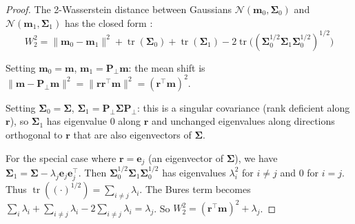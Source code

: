 \begin{proof}
The 2-Wasserstein distance between Gaussians $\mathcal{N}(\mathbf{m}_0, \boldsymbol{\Sigma}_0)$ and $\mathcal{N}(\mathbf{m}_1, \boldsymbol{\Sigma}_1)$ has the closed form \citep{dowson1982frechet,givens1984class}:
\begin{equation}
    W_2^2 = \|\mathbf{m}_0 - \mathbf{m}_1\|^2 + \operatorname{tr}(\boldsymbol{\Sigma}_0) + \operatorname{tr}(\boldsymbol{\Sigma}_1) - 2\operatorname{tr}\!\big((\boldsymbol{\Sigma}_0^{1/2}\boldsymbol{\Sigma}_1\boldsymbol{\Sigma}_0^{1/2})^{1/2}\big)
\end{equation}

Setting $\mathbf{m}_0 = \mathbf{m}$, $\mathbf{m}_1 = \mathbf{P}_\perp\mathbf{m}$: the mean shift is $\|\mathbf{m} - \mathbf{P}_\perp\mathbf{m}\|^2 = \|\mathbf{r}\mathbf{r}^\top\mathbf{m}\|^2 = (\mathbf{r}^\top\mathbf{m})^2$.

Setting $\boldsymbol{\Sigma}_0 = \boldsymbol{\Sigma}$, $\boldsymbol{\Sigma}_1 = \mathbf{P}_\perp\boldsymbol{\Sigma}\mathbf{P}_\perp$: this is a singular covariance (rank deficient along $\mathbf{r}$), so $\boldsymbol{\Sigma}_1$ has eigenvalue 0 along $\mathbf{r}$ and unchanged eigenvalues along directions orthogonal to $\mathbf{r}$ that are also eigenvectors of $\boldsymbol{\Sigma}$.

For the special case where $\mathbf{r} = \mathbf{e}_j$ (an eigenvector of $\boldsymbol{\Sigma}$), we have $\boldsymbol{\Sigma}_1 = \boldsymbol{\Sigma} - \lambda_j \mathbf{e}_j\mathbf{e}_j^\top$.
Then $\boldsymbol{\Sigma}_0^{1/2}\boldsymbol{\Sigma}_1\boldsymbol{\Sigma}_0^{1/2}$ has eigenvalues $\lambda_i^2$ for $i \neq j$ and $0$ for $i = j$.
Thus $\operatorname{tr}((\cdot)^{1/2}) = \sum_{i \neq j} \lambda_i$.
The Bures term becomes $\sum_i \lambda_i + \sum_{i \neq j} \lambda_i - 2\sum_{i \neq j}\lambda_i = \lambda_j$.
So $W_2^2 = (\mathbf{r}^\top\mathbf{m})^2 + \lambda_j$.


\end{proof}
